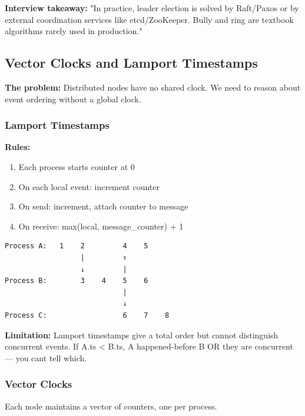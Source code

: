 \documentclass[11pt]{article}
\providecommand{\tightlist}{\setlength{\itemsep}{1pt}\setlength{\parskip}{0pt}}
\begin{document}
\textbf{Interview takeaway:} "In practice, leader election is solved by Raft/Paxos or by external coordination services like etcd/ZooKeeper. Bully and ring are textbook algorithms rarely used in production."

\subsection{Vector Clocks and Lamport Timestamps}\label{vector-clocks-and-lamport-timestamps}

\textbf{The problem:} Distributed nodes have no shared clock. We need to reason about event ordering without a global clock.

\subsubsection{Lamport Timestamps}\label{lamport-timestamps}

\textbf{Rules:}

\begin{enumerate}
\def\labelenumi{\arabic{enumi}.}
\tightlist
\item
  Each process starts counter at 0
\item
  On each local event: increment counter
\item
  On send: increment, attach counter to message
\item
  On receive: max(local, message\_counter) + 1
\end{enumerate}

\setcodelang{}

\begin{verbatim}
Process A:   1    2         4    5
                  |         ↑
                  ↓         |
Process B:        3    4    5    6
                            |
                            ↓
Process C:                  6    7    8
\end{verbatim}

\textbf{Limitation:} Lamport timestamps give a total order but cannot distinguish concurrent events. If A.ts \textless{} B.ts, A happened-before B OR they are concurrent --- you can\textquotesingle t tell which.

\subsubsection{Vector Clocks}\label{vector-clocks}

Each node maintains a vector of counters, one per process.
\end{document}
